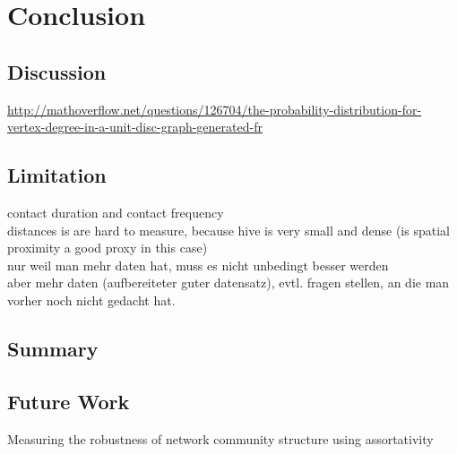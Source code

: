 \chapter{Conclusion}
\label{ch:conclusion}

\section{Discussion}
\url{http://mathoverflow.net/questions/126704/the-probability-distribution-for-vertex-degree-in-a-unit-disc-graph-generated-fr}

\section{Limitation}
contact duration and contact frequency\\
distances is are hard to measure, because hive is very small and dense (is spatial proximity a good proxy in this case)\\

nur weil man mehr daten hat, muss es nicht unbedingt besser werden\\
aber mehr daten (aufbereiteter guter datensatz), evtl. fragen stellen, an die man vorher noch nicht gedacht  hat.\\

\section{Summary}

\section{Future Work}

Measuring the robustness of network community structure using assortativity~\cite{shizuka2016measuring}